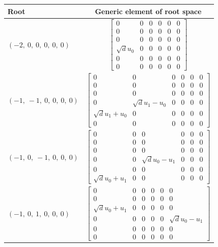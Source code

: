 \documentclass[11pt]{article}
\theoremstyle{definition}
\begin{document}
\noindent \begin{longtable}{|l|c|}
    \hline
    \textbf{Root} & \textbf{Generic element of root space} \\
    \hline
    \endhead
    $\left( -2, \  0, \  0, \  0, \  0, \  0\right)$ & ${\left[\begin{matrix}0 & 0 & 0 & 0 & 0 & 0\\0 & 0 & 0 & 0 & 0 & 0\\0 & 0 & 0 & 0 & 0 & 0\\\sqrt{d} u_{0} & 0 & 0 & 0 & 0 & 0\\0 & 0 & 0 & 0 & 0 & 0\\0 & 0 & 0 & 0 & 0 & 0\end{matrix}\right]}$ \\
    \hline
    $\left( -1, \  -1, \  0, \  0, \  0, \  0\right)$ & ${\left[\begin{matrix}0 & 0 & 0 & 0 & 0 & 0\\0 & 0 & 0 & 0 & 0 & 0\\0 & 0 & 0 & 0 & 0 & 0\\0 & \sqrt{d} u_{1} - u_{0} & 0 & 0 & 0 & 0\\\sqrt{d} u_{1} + u_{0} & 0 & 0 & 0 & 0 & 0\\0 & 0 & 0 & 0 & 0 & 0\end{matrix}\right]}$ \\
    \hline
    $\left( -1, \  0, \  -1, \  0, \  0, \  0\right)$ & ${\left[\begin{matrix}0 & 0 & 0 & 0 & 0 & 0\\0 & 0 & 0 & 0 & 0 & 0\\0 & 0 & 0 & 0 & 0 & 0\\0 & 0 & \sqrt{d} u_{0} - u_{1} & 0 & 0 & 0\\0 & 0 & 0 & 0 & 0 & 0\\\sqrt{d} u_{0} + u_{1} & 0 & 0 & 0 & 0 & 0\end{matrix}\right]}$ \\
    \hline
    $\left( -1, \  0, \  1, \  0, \  0, \  0\right)$ & ${\left[\begin{matrix}0 & 0 & 0 & 0 & 0 & 0\\0 & 0 & 0 & 0 & 0 & 0\\\sqrt{d} u_{0} + u_{1} & 0 & 0 & 0 & 0 & 0\\0 & 0 & 0 & 0 & 0 & \sqrt{d} u_{0} - u_{1}\\0 & 0 & 0 & 0 & 0 & 0\\0 & 0 & 0 & 0 & 0 & 0\end{matrix}\right]}$ \\

\end{longtable}
\end{document}
